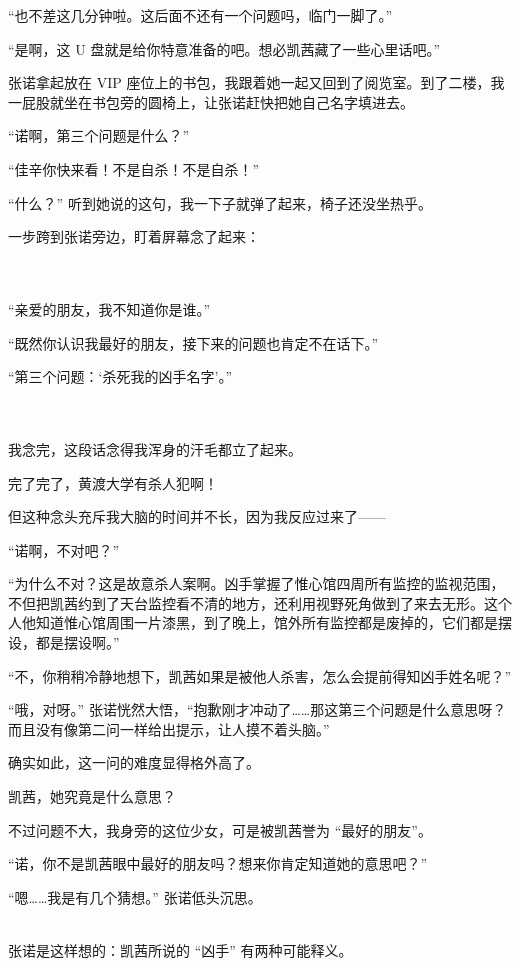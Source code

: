 \documentclass[UTF8]{ctexart}
\begin{document}
“也不差这几分钟啦。这后面不还有一个问题吗，临门一脚了。”

“是啊，这 U 盘就是给你特意准备的吧。想必凯茜藏了一些心里话吧。”

张诺拿起放在 VIP 座位上的书包，我跟着她一起又回到了阅览室。到了二楼，我一屁股就坐在书包旁的圆椅上，让张诺赶快把她自己名字填进去。

“诺啊，第三个问题是什么？”

“佳辛你快来看！不是自杀！不是自杀！”

“什么？” 听到她说的这句，我一下子就弹了起来，椅子还没坐热乎。

一步跨到张诺旁边，盯着屏幕念了起来：

~\\
~\\

“亲爱的朋友，我不知道你是谁。”

“既然你认识我最好的朋友，接下来的问题也肯定不在话下。”

“第三个问题：‘杀死我的凶手名字’。”

~\\
~\\

我念完，这段话念得我浑身的汗毛都立了起来。

完了完了，黄渡大学有杀人犯啊！

但这种念头充斥我大脑的时间并不长，因为我反应过来了——

“诺啊，不对吧？”

“为什么不对？这是故意杀人案啊。凶手掌握了惟心馆四周所有监控的监视范围，不但把凯茜约到了天台监控看不清的地方，还利用视野死角做到了来去无形。这个人他知道惟心馆周围一片漆黑，到了晚上，馆外所有监控都是废掉的，它们都是摆设，都是摆设啊。”

“不，你稍稍冷静地想下，凯茜如果是被他人杀害，怎么会提前得知凶手姓名呢？”

“哦，对呀。” 张诺恍然大悟，“抱歉刚才冲动了……那这第三个问题是什么意思呀？而且没有像第二问一样给出提示，让人摸不着头脑。”

确实如此，这一问的难度显得格外高了。

凯茜，她究竟是什么意思？

不过问题不大，我身旁的这位少女，可是被凯茜誉为 “最好的朋友”。

“诺，你不是凯茜眼中最好的朋友吗？想来你肯定知道她的意思吧？”

“嗯……我是有几个猜想。” 张诺低头沉思。

~\\

张诺是这样想的：凯茜所说的 “凶手” 有两种可能释义。
\end{document}
